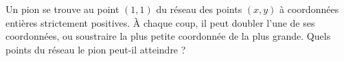 Un pion se trouve au point $(1, 1)$ du réseau des points $(x, y)$ à coordonnées entières strictement positives. À chaque coup, il peut doubler l'une de ses coordonnées, ou soustraire la plus petite coordonnée de la plus grande. Quels points du réseau le pion peut-il atteindre ?
